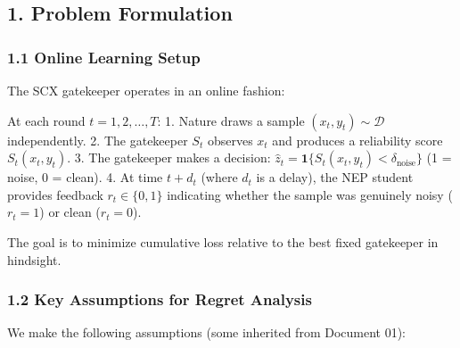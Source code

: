 \documentclass[
  12pt,
]{ctexart}
\begin{document}
\subsection{1. Problem Formulation}\label{problem-formulation}

\subsubsection{1.1 Online Learning Setup}\label{online-learning-setup}

The SCX gatekeeper operates in an online fashion:

At each round \(t = 1, 2, \dots, T\): 1. Nature draws a sample
\((x_t, y_t) \sim \mathcal{D}\) independently. 2. The gatekeeper \(S_t\)
observes \(x_t\) and produces a reliability score \(S_t(x_t, y_t)\). 3.
The gatekeeper makes a decision:
\(\hat{z}_t = \mathbf{1}\{S_t(x_t, y_t) < \delta_{\text{noise}}\}\) (1 =
noise, 0 = clean). 4. At time \(t + d_t\) (where \(d_t\) is a delay),
the NEP student provides feedback \(r_t \in \{0, 1\}\) indicating
whether the sample was genuinely noisy (\(r_t = 1\)) or clean
(\(r_t = 0\)).

The goal is to minimize cumulative loss relative to the best fixed
gatekeeper in hindsight.

\subsubsection{1.2 Key Assumptions for Regret
Analysis}\label{key-assumptions-for-regret-analysis}

We make the following assumptions (some inherited from Document 01):
\end{document}
